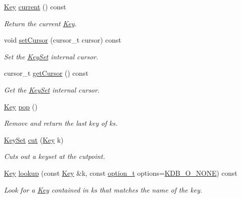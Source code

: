 \begin{DoxyCompactItemize}
\hyperlink{classkdb_1_1Key}{Key} \hyperlink{classkdb_1_1KeySet_a2c9c26dbbf5ec0ed82093e1793a79fe1}{current} () const 
\begin{DoxyCompactList}\small\item\em Return the current \hyperlink{classkdb_1_1Key}{Key}.  \end{DoxyCompactList}\item 
void \hyperlink{classkdb_1_1KeySet_a844be268914882e5159424e9ee302119}{set\-Cursor} (cursor\-\_\-t cursor) const 
\begin{DoxyCompactList}\small\item\em Set the \hyperlink{classkdb_1_1KeySet}{Key\-Set} internal cursor.  \end{DoxyCompactList}\item 
cursor\-\_\-t \hyperlink{classkdb_1_1KeySet_ab3b63a96df7100e58cbb812e3d4223f2}{get\-Cursor} () const 
\begin{DoxyCompactList}\small\item\em Get the \hyperlink{classkdb_1_1KeySet}{Key\-Set} internal cursor.  \end{DoxyCompactList}\item 
\hyperlink{classkdb_1_1Key}{Key} \hyperlink{classkdb_1_1KeySet_a7f207457a1c12633a1a5301a3a1bbaed}{pop} ()
\begin{DoxyCompactList}\small\item\em Remove and return the last key of {\ttfamily ks}.  \end{DoxyCompactList}\item 
\hyperlink{classkdb_1_1KeySet}{Key\-Set} \hyperlink{classkdb_1_1KeySet_ab283da798a7670d5c3f0e1a5b821e666}{cut} (\hyperlink{classkdb_1_1Key}{Key} k)
\begin{DoxyCompactList}\small\item\em Cuts out a keyset at the cutpoint.  \end{DoxyCompactList}\item 
\hyperlink{classkdb_1_1Key}{Key} \hyperlink{classkdb_1_1KeySet_a816e7468abe296f8352e090738c215cc}{lookup} (const \hyperlink{classkdb_1_1Key}{Key} \&k, const \hyperlink{group__keyset_ga98a3d6a4016c9dad9cbd1a99a9c2a45a}{option\-\_\-t} options=\hyperlink{group__keyset_gga98a3d6a4016c9dad9cbd1a99a9c2a45aa00738455e0ae843c8720809d8287f370}{K\-D\-B\-\_\-\-O\-\_\-\-N\-O\-N\-E}) const 
\begin{DoxyCompactList}\small\item\em Look for a \hyperlink{classkdb_1_1Key}{Key} contained in {\ttfamily ks} that matches the name of the {\ttfamily key}.  \end{DoxyCompactList}\item 

\end{DoxyCompactItemize}

